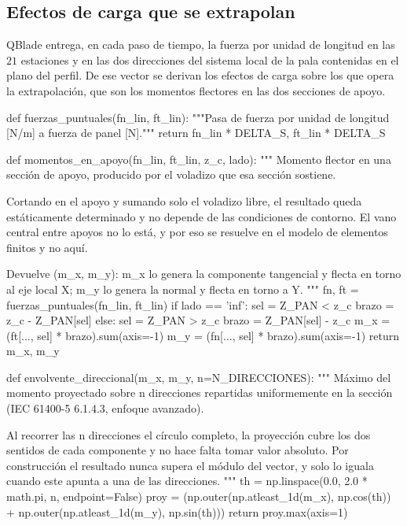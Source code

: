\subsection*{Efectos de carga que se extrapolan}

QBlade entrega, en cada paso de tiempo, la fuerza por unidad de longitud en las $21$ estaciones y en las dos direcciones del sistema local de la pala contenidas en el plano del perfil. De ese vector se derivan los efectos de carga sobre los que opera la extrapolación, que son los momentos flectores en las dos secciones de apoyo.

\begin{pycode}
def fuerzas_puntuales(fn_lin, ft_lin):
    """Pasa de fuerza por unidad de longitud [N/m] a fuerza de panel [N]."""
    return fn_lin * DELTA_S, ft_lin * DELTA_S


def momentos_en_apoyo(fn_lin, ft_lin, z_c, lado):
    """
    Momento flector en una sección de apoyo, producido por el voladizo que
    esa sección sostiene.

    Cortando en el apoyo y sumando solo el voladizo libre, el resultado
    queda estáticamente determinado y no depende de las condiciones de
    contorno. El vano central entre apoyos no lo está, y por eso se
    resuelve en el modelo de elementos finitos y no aquí.

    Devuelve (m_x, m_y): m_x lo genera la componente tangencial y flecta
    en torno al eje local X; m_y lo genera la normal y flecta en torno a Y.
    """
    fn, ft = fuerzas_puntuales(fn_lin, ft_lin)
    if lado == 'inf':
        sel   = Z_PAN < z_c
        brazo = z_c - Z_PAN[sel]
    else:
        sel   = Z_PAN > z_c
        brazo = Z_PAN[sel] - z_c
    m_x = (ft[..., sel] * brazo).sum(axis=-1)
    m_y = (fn[..., sel] * brazo).sum(axis=-1)
    return m_x, m_y


def envolvente_direccional(m_x, m_y, n=N_DIRECCIONES):
    """
    Máximo del momento proyectado sobre n direcciones repartidas
    uniformemente en la sección (IEC 61400-5 6.1.4.3, enfoque avanzado).

    Al recorrer las n direcciones el círculo completo, la proyección cubre
    los dos sentidos de cada componente y no hace falta tomar valor
    absoluto. Por construcción el resultado nunca supera el módulo del
    vector, y solo lo iguala cuando este apunta a una de las direcciones.
    """
    th   = np.linspace(0.0, 2.0 * math.pi, n, endpoint=False)
    proy = (np.outer(np.atleast_1d(m_x), np.cos(th))
            + np.outer(np.atleast_1d(m_y), np.sin(th)))
    return proy.max(axis=1)



\end{pycode}
